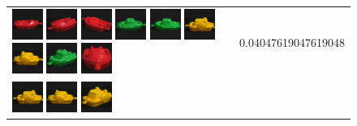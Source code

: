 \begin{figure}[!bp]
\begin{tabular}{m{11cm} | m{3cm} |}
\includegraphics[width=1cm]{coil/beeld-19.eps}
\includegraphics[width=1cm]{coil/beeld-21.eps}
\includegraphics[width=1cm]{coil/beeld-22.eps}
\includegraphics[width=1cm]{coil/beeld-55.eps}
\includegraphics[width=1cm]{coil/beeld-54.eps}
\includegraphics[width=1cm]{coil/beeld-12.eps}
\includegraphics[width=1cm]{coil/beeld-13.eps}
\includegraphics[width=1cm]{coil/beeld-57.eps}
\includegraphics[width=1cm]{coil/beeld-20.eps}
& {\scriptsize 0.04047619047619048}
\\
\includegraphics[width=1cm]{coil/beeld-12.eps}
\includegraphics[width=1cm]{coil/beeld-13.eps}
\includegraphics[width=1cm]{coil/beeld-15.eps}

\end{tabular}
\end{figure}
